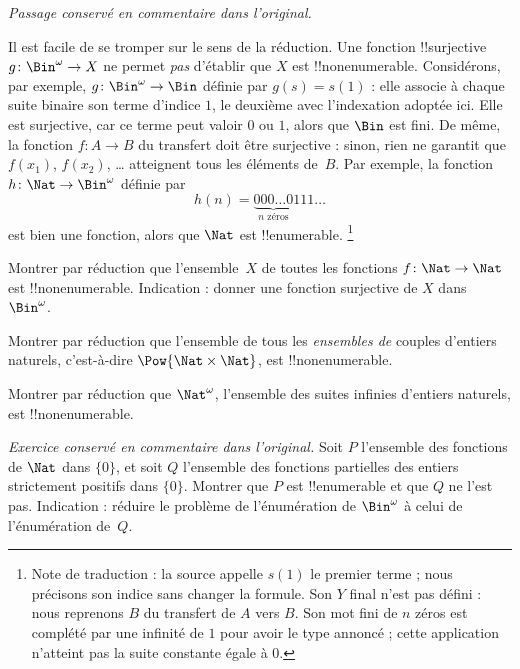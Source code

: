 \documentclass[11pt,a4paper,openany]{memoir}
\begin{document}
\begin{editorial}\textit{Passage conservé en commentaire dans l'original.}
\begin{explain}
Il est facile de se tromper sur le sens de la réduction. Une fonction
!!{surjective} $g\colon \Bin^\omega \to X$ ne permet \emph{pas}
d'établir que $X$ est !!{nonenumerable}. Considérons, par exemple,
$g\colon \Bin^\omega \to \Bin$ définie par $g(s) = s(1)$ : elle
associe à chaque suite binaire son terme d'indice $1$, le deuxième
avec l'indexation adoptée ici. Elle est surjective, car ce terme peut
valoir $0$ ou $1$, alors que $\Bin$ est fini. De même, la fonction
$f\colon A \to B$ du transfert doit être surjective : sinon,
rien ne garantit que $f(x_1)$, $f(x_2)$, \dots{} atteignent tous
les éléments de~$B$. Par exemple, la fonction $h\colon \Nat \to
\Bin^\omega$ définie par
\[
h(n) = \underbrace{000\dots0}_{\text{$n$ zéros}}111\dots
\]
est bien une fonction, alors que $\Nat$ est !!{enumerable}.
\footnote{Note de traduction : la source appelle $s(1)$ le premier
terme ; nous précisons son indice sans changer la formule. Son $Y$
final n'est pas défini : nous reprenons $B$ du transfert de $A$ vers $B$.
Son mot fini de $n$ zéros est complété par une infinité de $1$ pour
avoir le type annoncé ; cette application n'atteint pas la suite
constante égale à $0$.}
\end{explain}
\end{editorial}

\begin{prob}\label{sfr:siz:red-alt:prob:nat-nat}
  Montrer par réduction que l'ensemble~$X$ de toutes les fonctions
  $f\colon \Nat \to \Nat$ est !!{nonenumerable}. Indication :
  donner une fonction surjective de $X$ dans~$\Bin^\omega$.
\end{prob}

\begin{prob}
Montrer par réduction que l'ensemble de tous les \emph{ensembles de}
couples d'entiers naturels, c'est-à-dire $\Pow{\Nat \times \Nat}$,
est !!{nonenumerable}.
\end{prob}

\begin{prob}
Montrer par réduction que $\Nat^\omega$, l'ensemble des suites
infinies d'entiers naturels, est !!{nonenumerable}.
\end{prob}

\begin{prob}
\textit{Exercice conservé en commentaire dans l'original.}
Soit $P$ l'ensemble des fonctions de $\Nat$ dans $\{0\}$, et soit $Q$
l'ensemble des fonctions partielles des entiers strictement positifs
dans $\{0\}$. Montrer que $P$ est !!{enumerable} et que $Q$ ne l'est pas.
Indication : réduire le problème de l'énumération de $\Bin^\omega$
à celui de l'énumération de~$Q$.
\end{prob}
\end{document}
